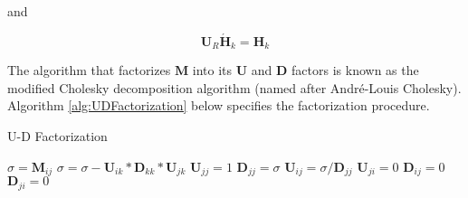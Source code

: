 and

\begin{equation*}
    \mathbf{U}_R \mathbf{\acute{H}}_k = \mathbf{H}_k
\end{equation*}

The algorithm that factorizes $\mathbf{M}$ into its $\mathbf{U}$ and $\mathbf{D}$ factors
is known as the modified Cholesky decomposition algorithm (named after André-Louis Cholesky).
Algorithm \ref{alg:UDFactorization} below specifies the factorization procedure.

\begin{algorithm}
    \caption{U-D Factorization}
    \label{alg:UDFactorization}
    \begin{algorithmic}
                \STATE $\sigma = \mathbf{M}_{ij}$
                    \STATE $\sigma = \sigma - \mathbf{U}_{ik} * \mathbf{D}_{kk} * \mathbf{U}_{jk}$
                \ENDFOR
                    \STATE $\mathbf{U}_{jj} = 1$
                    \STATE $\mathbf{D}_{jj} = \sigma$
                \ELSE
                    \STATE $\mathbf{U}_{ij} = \sigma / \mathbf{D}_{jj}$
                    \STATE $\mathbf{U}_{ji} = 0$
                    \STATE $\mathbf{D}_{ij} = 0$
                    \STATE $\mathbf{D}_{ji} = 0$
                \ENDIF
            \ENDFOR
        \ENDFOR
    \end{algorithmic}
\end{algorithm}
